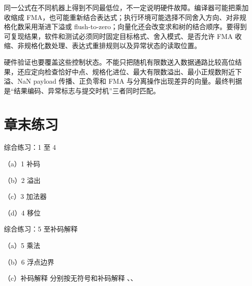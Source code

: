 
同一公式在不同机器上得到不同最低位，不一定说明硬件故障。编译器可能把乘加收缩成 FMA，也可能重新结合表达式；执行环境可能选择不同舍入方向、对非规格化数采用渐进下溢或 flush-to-zero；向量化还会改变求和树的结合顺序。要得到可复现结果，软件和测试必须同时固定目标格式、舍入模式、是否允许 FMA 收缩、非规格化数处理、表达式重排规则以及异常状态的读取位置。

硬件验证也要覆盖这些控制状态。不能只把随机有限数送入数据通路比较高位结果，还应定向检查恰好中点、规格化进位、最大有限数溢出、最小正规数附近下溢、NaN payload 传播、正负零和 FMA 与分离操作出现差异的向量。最终判据是“结果编码、异常标志与提交时机”三者同时匹配。

\section*{章末练习}

\begin{chapterexercise}{综合练习：1 至 4}
\begin{exercisesubproblem}{（a）1}
补码
\end{exercisesubproblem}
\begin{exercisesubproblem}{（b）2}
溢出
\end{exercisesubproblem}
\begin{exercisesubproblem}{（c）3}
加法器
\end{exercisesubproblem}
\begin{exercisesubproblem}{（d）4}
移位
\end{exercisesubproblem}
\end{chapterexercise}

\begin{chapterexercise}{综合练习：5 至补码解释}
\begin{exercisesubproblem}{（a）5}
乘法
\end{exercisesubproblem}
\begin{exercisesubproblem}{（b）6}
浮点边界
\end{exercisesubproblem}
\begin{exercisesubproblem}{（c）补码解释}
分别按无符号和补码解释 、、
\end{exercisesubproblem}
\end{chapterexercise}

